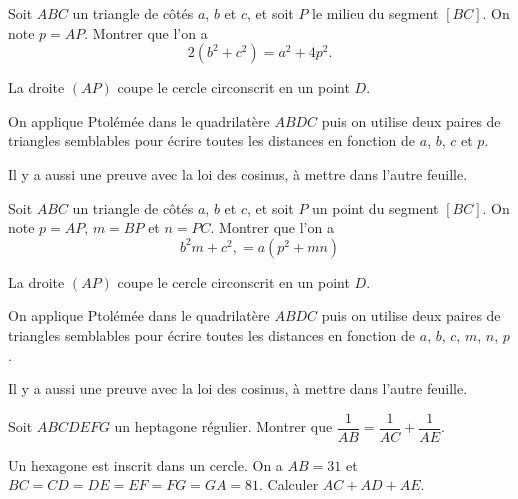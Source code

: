 \begin{exo}
Soit $ABC$ un triangle de côtés $a$, $b$ et $c$, et soit $P$ le milieu du segment $[BC]$. On note $p=AP$.
Montrer que l'on a 
\[ 2(b^2+c^2)=a^2+4p^2.\]
\begin{hint}
La droite $(AP)$ coupe le cercle circonscrit en un point $D$. 
\end{hint}
\begin{sol}
On applique Ptolémée dans le quadrilatère $ABDC$ puis on utilise deux paires de triangles semblables pour écrire toutes les distances en fonction de $a$, $b$, $c$ et $p$.

Il y a aussi une preuve avec la loi des cosinus, à mettre dans l'autre feuille.
\end{sol}
\end{exo}

\begin{exo}
Soit $ABC$ un triangle de côtés $a$, $b$ et $c$, et soit $P$ un point du segment $[BC]$. On note $p=AP$, $m=BP$ et $n=PC$.
Montrer que l'on a 
\[ b^2m+c^2,=a(p^2+mn)\]
\begin{hint}
La droite $(AP)$ coupe le cercle circonscrit en un point $D$. 
\end{hint}
\begin{sol}
On applique Ptolémée dans le quadrilatère $ABDC$ puis on utilise deux paires de triangles semblables pour écrire toutes les distances en fonction de $a$, $b$, $c$, $m$, $n$, $p$.

Il y a aussi une preuve avec la loi des cosinus, à mettre dans l'autre feuille.
\end{sol}
\end{exo}



\begin{exo}
Soit $ABCDEFG$ un heptagone régulier.
Montrer que $\dfrac{1}{AB} = \dfrac{1}{AC} +\dfrac{1}{AE}$.
\end{exo}

\begin{exo}
Un hexagone est inscrit dans un cercle. 
On a $AB=31$ et $BC=CD=DE=EF=FG=GA=81$.
Calculer $AC+AD+AE$.
\end{exo}




